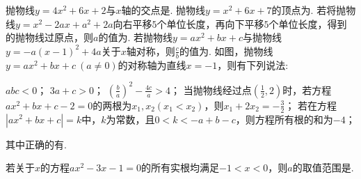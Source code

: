 \documentclass[10pt]{article}
\begin{document}
\begin{questions}{\complitingintroduction}
    \question 抛物线$y = 4x^{2} + 6x + 2$与$x$轴的交点是\complitingline.
    \question 抛物线$y = x^{2} + 6x + 7$的顶点为\complitingline.
    \question 若将抛物线$y=x^2-2ax+a^2+2a$向右平移$5$个单位长度，再向下平移$5$个单位长度，得到的抛物线过原点，则$a$的值为\complitingline.
    \question 若抛物线$y = ax^{2} + bx + c$与抛物线$y = - a(x - 1)^{2} + 4a$关于$x$轴对称，则$\frac{c}{b}$的值为\complitingline.
    \question 如图，抛物线$y = ax^{2} + bx + c \ (a \neq 0)$的对称轴为直线$x = - 1$，则有下列说法:
    \begin{subsubquestions}
        \subsubquestion $abc < 0$；
        \subsubquestion $3a + c > 0$；
        \subsubquestion $\left( \frac{b}{a} \right)^{2} - \frac{4c}{a} > 4$；
        \subsubquestion 当抛物线经过点$\left( \frac{1}{2},2 \right)$时，若方程$ax^{2} + bx + c - 2 = 0$的两根为$x_{1},x_{2}\left( x_{1} < x_{2} \right)$，则$x_{1} + 2x_{2} = - \frac{3}{2}$；
        \subsubquestion 若在方程$\left| ax^{2} + bx + c \right| = k$中，$k$为常数，且$0 < k < - a + b - c$，则方程所有根的和为$- 4$；
    \end{subsubquestions}
    其中正确的有\complitingline.
    \begin{figure}[!htb]
        \centering
        \raggedleft
    \end{figure}
    \question 若关于$x$的方程$ax^2-3x-1=0$的所有实根均满足$-1<x<0$，则$a$的取值范围是\complitingline.
\end{questions}
\end{document}
